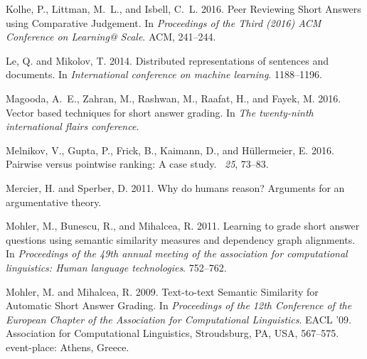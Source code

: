 \documentclass[notitlepage,12pt]{jedm}
\begin{document}
\begin{thebibliography}{}
{\sc Kolhe, P.}, {\sc Littman, M.~L.}, {\sc and} {\sc Isbell, C.~L.} 2016.
\newblock Peer {Reviewing} {Short} {Answers} using {Comparative} {Judgement}.
\newblock In {\em Proceedings of the {Third} (2016) {ACM} {Conference} on
  {Learning}@ {Scale}}. ACM, 241--244.

{\sc Le, Q.} {\sc and} {\sc Mikolov, T.} 2014.
\newblock Distributed representations of sentences and documents.
\newblock In {\em International conference on machine learning}. 1188--1196.

{\sc Magooda, A.~E.}, {\sc Zahran, M.}, {\sc Rashwan, M.}, {\sc Raafat, H.},
  {\sc and} {\sc Fayek, M.} 2016.
\newblock Vector based techniques for short answer grading.
\newblock In {\em The twenty-ninth international flairs conference}.

{\sc Melnikov, V.}, {\sc Gupta, P.}, {\sc Frick, B.}, {\sc Kaimann, D.}, {\sc
  and} {\sc H{\"u}llermeier, E.} 2016.
\newblock Pairwise versus pointwise ranking: A case study.
~{\em 25}, 73--83.

{\sc Mercier, H.} {\sc and} {\sc Sperber, D.} 2011.
\newblock Why do humans reason? {Arguments} for an argumentative theory.

{\sc Mohler, M.}, {\sc Bunescu, R.}, {\sc and} {\sc Mihalcea, R.} 2011.
\newblock Learning to grade short answer questions using semantic similarity
  measures and dependency graph alignments.
\newblock In {\em Proceedings of the 49th annual meeting of the association for
  computational linguistics: {Human} language technologies}. 752--762.

{\sc Mohler, M.} {\sc and} {\sc Mihalcea, R.} 2009.
\newblock Text-to-text {Semantic} {Similarity} for {Automatic} {Short} {Answer}
  {Grading}.
\newblock In {\em Proceedings of the 12th {Conference} of the {European}
  {Chapter} of the {Association} for {Computational} {Linguistics}}. {EACL}
  '09. Association for Computational Linguistics, Stroudsburg, PA, USA,
  567--575.
\newblock event-place: Athens, Greece.


\end{thebibliography}
\end{document}
